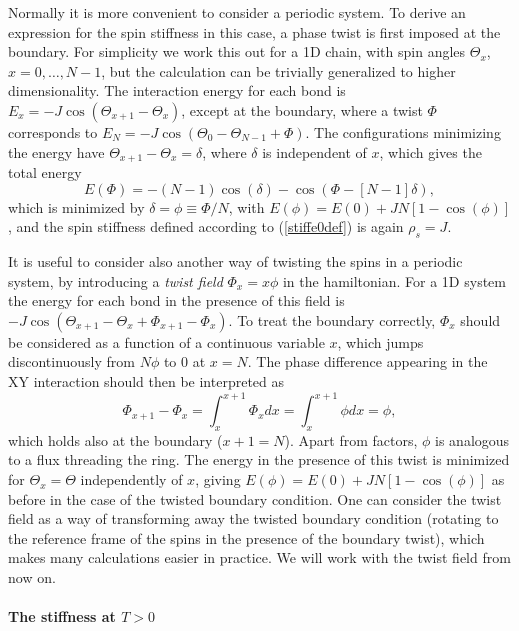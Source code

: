 \documentclass[draft,numberedheadings]{aipproc}
\begin{document}
Normally it is more convenient to consider a periodic system. To derive an expression for the spin stiffness in this case, a phase
twist is first imposed at the boundary. For simplicity we work this out for a 1D chain, with spin angles $\Theta_x$, $x=0,\ldots,N-1$, but the calculation can 
be trivially generalized to higher dimensionality. The interaction energy for each bond is $E_x=-J\cos(\Theta_{x+1}-\Theta_x)$, except at the boundary, 
where a twist $\Phi$ corresponds to $E_N=-J\cos(\Theta_{0}-\Theta_{N-1}+\Phi)$. The configurations minimizing the energy have $\Theta_{x+1}-\Theta_x=\delta$, 
where $\delta$ is independent of $x$, which gives the total energy 
\begin{equation}
E(\Phi)=-(N-1)\cos(\delta)-\cos(\Phi-[N-1]\delta),
\end{equation}
which is minimized by $\delta=\phi\equiv \Phi/N$, with $E(\phi)=E(0)+JN[1-\cos(\phi)]$, and the spin stiffness defined according to (\ref{stiffe0def}) 
is again $\rho_s=J$.

It is useful to consider also another way of twisting the spins in a periodic system, by introducing a {\it twist field} $\Phi_x=x\phi$ in the hamiltonian. 
For a 1D system the energy for each bond in the presence of this field is $-J\cos(\Theta_{x+1}-\Theta_x+\Phi_{x+1}-\Phi_{x})$. To treat the boundary correctly, 
$\Phi_x$ should be considered as a function of a continuous variable $x$, which jumps discontinuously from $N\phi$ to $0$ at $x=N$. The phase difference 
appearing in the XY interaction should then be interpreted as
\begin{equation}
\Phi_{x+1}-\Phi_x=\int_{x}^{x+1} \Phi_x dx = \int_{x}^{x+1} \phi dx=\phi,
\end{equation}
which holds also at the boundary ($x+1=N$). Apart from factors, $\phi$ is analogous to a flux threading the ring. The energy in the presence of this twist 
is minimized for $\Theta_x=\Theta$ independently of $x$, giving $E(\phi)=E(0)+JN[1-\cos(\phi)]$ as before in the case of the twisted boundary condition. One 
can consider the twist field as a way of transforming away the twisted boundary condition (rotating to the reference frame of the spins in the presence of 
the boundary twist), which makes many calculations easier in practice. We will work with the twist field from now on.

\paragraph{The stiffness at $T>0$}
\end{document}
